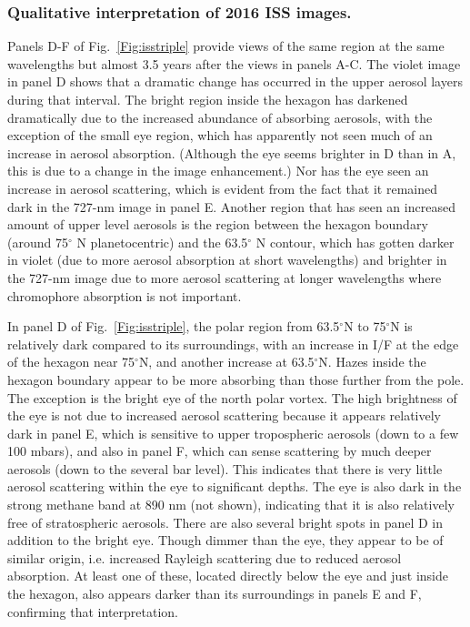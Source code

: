 \documentclass[article,11pt]{emulateapj}
\def\deg{$^\circ$ }
\def\degx{$^\circ$}
\begin{document}
\subsubsection{Qualitative interpretation of 2016 ISS images. } 
Panels D-F of Fig.\ \ref{Fig:isstriple} provide views of the same region
at the same wavelengths but almost 3.5 years after the views in panels A-C.  
The violet image in panel D
shows that a dramatic change has occurred in the upper aerosol layers during that interval. 
 The bright region inside
the hexagon has darkened dramatically due to the increased abundance
of absorbing aerosols, with the exception of the small eye region, which has
apparently not seen much of an increase in aerosol absorption. (Although
the eye seems brighter in D than in A, this is due to a change in
the image enhancement.) Nor has
the eye seen an increase in aerosol scattering, which is evident from the
fact that it remained dark in the 727-nm image in panel E.  
Another region that has seen an increased amount of upper level
aerosols is the region between the hexagon boundary (around 75\deg N planetocentric)
and the 63.5\deg N contour, which has gotten darker in violet (due to more
aerosol absorption at short wavelengths) and brighter in the 727-nm image due to more aerosol scattering
at longer wavelengths where chromophore absorption is not important.

In panel D of Fig.\ \ref{Fig:isstriple}, the polar region from
63.5\degx N to 75\degx N is relatively dark compared to its
surroundings, with an increase in I/F at the edge of the hexagon near
75\degx N, and another increase at 63.5\degx N. Hazes inside
the hexagon boundary appear to be more absorbing than those further from the
pole.  The exception is the bright eye of the north polar vortex.  The
high brightness of the eye is not due to increased aerosol scattering because it
appears relatively dark in panel E, which is sensitive to upper
tropospheric aerosols (down to a few 100 mbars), and also in panel F, which can sense scattering
by much deeper aerosols (down to the several bar level). This indicates that there is very little
aerosol scattering within the eye to significant depths. The eye is
also dark in the strong methane band at 890 nm (not shown), indicating
that it is also relatively free of stratospheric aerosols.  
There are also several bright spots in panel D in addition to the
bright eye.  Though dimmer than the eye, they appear to be of similar origin,
i.e. increased Rayleigh scattering due to reduced aerosol absorption.
At least one of these, located directly below the eye and just inside the hexagon,
also appears darker than its surroundings in panels E and F, confirming
that interpretation.
\end{document}
